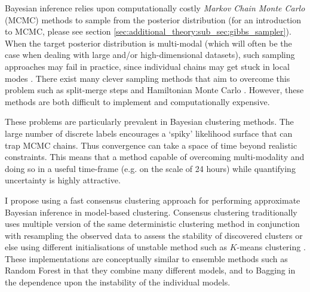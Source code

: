 \documentclass[12pt]{article} %
\begin{document}
	Bayesian inference relies upon computationally costly \emph{Markov Chain Monte Carlo} (MCMC) methods to sample from the posterior distribution (for an introduction to MCMC, please see section \ref{sec:additional_theory:sub_sec:gibbs_sampler}). When the target posterior distribution is multi-modal (which will often be the case when dealing with large and/or high-dimensional datasets), such sampling approaches may fail in practice, since individual chains may get stuck in local modes \citep{TjelmelandModeJumpingProposals2001}. There exist many clever sampling methods that aim to overcome this problem such as split-merge steps \citep{dahl_sequentially-allocated_2005} and Hamiltonian Monte Carlo \citep{duane1987hybrid, hoffman2014no}. However, these methods are both difficult to implement and computationally expensive.
	
	
	
	These problems are particularly prevalent in Bayesian clustering methods. The large number of discrete labels encourages a `spiky' likelihood surface that can trap MCMC chains. Thus convergence can take a space of time beyond realistic constraints. This means that a method capable of overcoming multi-modality and doing so in a useful time-frame (e.g. on the scale of 24 hours) while quantifying uncertainty is highly attractive. 
	
	I propose using a fast consensus clustering approach for performing approximate Bayesian inference in model-based clustering.  Consensus clustering traditionally uses multiple version of the same deterministic clustering method in conjunction with resampling the observed data to assess the stability of discovered clusters or else using different initialisations of unstable method such as $K$-means clustering \citep{MontiConsensusClusteringResamplingBased}. These implementations are conceptually similar to ensemble methods such as Random Forest \citep{BreimanRandomForests2001} in that they combine many different models, and to Bagging \citep{BreimanBaggingpredictors1996} in the dependence upon the instability of the individual models.
	
\end{document}

